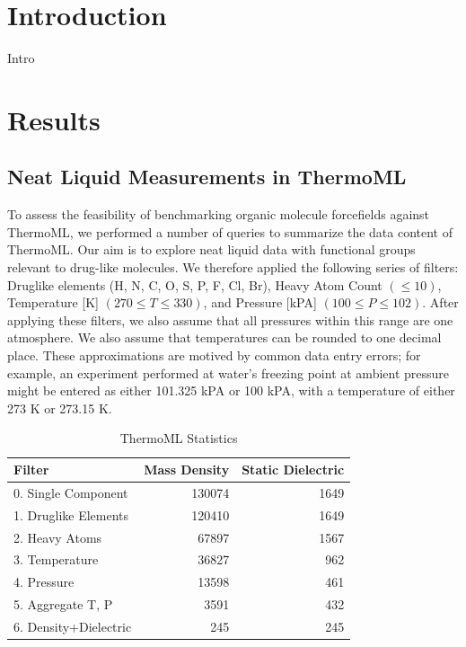 \documentclass[aps,pre,twocolumn,superscriptaddress]{revtex4-1}
\begin{document}
\section{Introduction}

Intro

\section{Results}

\subsection{Neat Liquid Measurements in ThermoML}

To assess the feasibility of benchmarking organic molecule forcefields against ThermoML, we performed a number of queries to summarize the data content of ThermoML.  Our aim is to explore neat liquid data with functional groups relevant to drug-like molecules.  We therefore applied the following series of filters: Druglike elements (H, N, C, O, S, P, F, Cl, Br), Heavy Atom Count $(\le 10)$, Temperature [K] $(270 \le T \le 330)$, and Pressure [kPA] $(100 \le P \le 102)$.  After applying these filters, we also assume that all pressures within this range are one atmosphere.  We also assume that temperatures can be rounded to one decimal place.  These approximations are motived by common data entry errors; for example, an experiment performed at water's freezing point at ambient pressure might be entered as either 101.325 kPA or 100 kPA, with a temperature of either 273 K or 273.15 K.

\begin{table}
\begin{tabular}{lrr}
\toprule
Filter &  Mass Density &  Static Dielectric \\
\midrule
0.  Single Component   &               130074 &                                     1649 \\
1.  Druglike Elements  &               120410 &                                     1649 \\
2.  Heavy Atoms        &                67897 &                                     1567 \\
3.  Temperature        &                36827 &                                      962 \\
4.  Pressure           &                13598 &                                      461 \\
5.  Aggregate T, P     &                 3591 &                                      432 \\
6.  Density+Dielectric &                  245 &                                      245 \\
\bottomrule
\end{tabular}
\label{Table:Measurements}
\caption{ThermoML Statistics}
\end{table}
\end{document}

